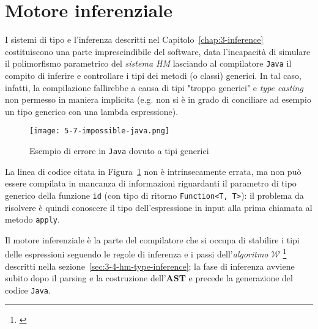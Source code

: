\section{Motore inferenziale}
\label{sec:5-7-inference-engine}

I sistemi di tipo e l'inferenza descritti nel Capitolo~\ref{chap:3-inference} costituiscono una parte imprescindibile del software,
data l'incapacità di simulare il polimorfismo parametrico del \textit{sistema HM} lasciando al compilatore \texttt{Java}
il compito di inferire e controllare i tipi dei metodi (o classi) generici.
In tal caso, infatti, la compilazione fallirebbe a causa di tipi "troppo generici" e \textit{type casting} non permesso
in maniera implicita (e.g. non si è in grado di conciliare ad esempio un tipo generico con una lambda espressione).

\begin{figure}
    \vspace{4mm}
    \texttt{[image: 5-7-impossible-java.png]}
    \caption{Esempio di errore in \texttt{Java} dovuto a tipi generici}
    \label{fig:5-7-impossible-java}
    \vspace{4mm}
\end{figure}

\noindent La linea di codice citata in Figura~\ref{fig:5-7-impossible-java} non è intrinsecamente errata,
ma non può essere compilata in mancanza di informazioni riguardanti il parametro di tipo generico della funzione \texttt{id}
(con tipo di ritorno \texttt{Function<T, T>}): il problema da risolvere è quindi conoscere il tipo dell'espressione
in input alla prima chiamata al metodo \texttt{apply}.


Il motore inferenziale è la parte del compilatore che si occupa di stabilire i tipi delle espressioni seguendo le regole
di inferenza e i passi dell'\textit{algoritmo $\mathcal{W}$}%
\footnote{ \cite{Grabmuller-2006-AlgorithmW}}
descritti nella sezione~\ref{sec:3-4-hm-type-inference}; la fase di inferenza avviene subito dopo il parsing
e la costruzione dell'\textbf{AST} e precede la generazione del codice \texttt{Java}.



\newpage

